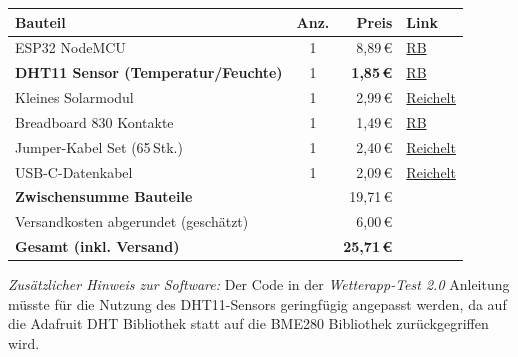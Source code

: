 \documentclass[a4paper,12pt]{article}
\begin{document}
\begin{table}[h!]
\centering
\renewcommand{\arraystretch}{1.35}
\begin{tabular}{@{} l c r l @{}}
\toprule
\textbf{Bauteil} & \textbf{Anz.} & \textbf{Preis} & \textbf{Link} \\
\midrule

ESP32 NodeMCU
  & 1 & 8,89\,\euro{}
  & \href{https://www.roboter-bausatz.de/p/nodemcu-esp32-usb-c-38-pin}{RB} \\

\textbf{DHT11 Sensor (Temperatur/Feuchte)}
  & 1 & \textbf{1,85\,\euro{}}
  & \href{https://www.roboter-bausatz.de/p/dht11-digitaler-feuchtigkeits-und-temperatursensor}{RB} \\

Kleines Solarmodul
  & 1 & 2,99\,\euro{}
  & \href{https://www.reichelt.de/de/de/shop/produkt/entwicklerboards_-_solarpanel_0_5_w-254385}{Reichelt} \\

Breadboard 830 Kontakte
  & 1 & 1,49\,\euro{}
  & \href{https://www.roboter-bausatz.de/p/mb102-breadboard-830-kontakte}{RB} \\

Jumper-Kabel Set (65\,Stk.)
  & 1 & 2,40\,\euro{}
  & \href{https://www.reichelt.de/de/de/shop/produkt/entwicklerboards_-_kabel-set_verschiedene_laengen_65er-pack_-282690}{Reichelt} \\

USB-C-Datenkabel
  & 1 & 2,09\,\euro{}
  & \href{https://www.reichelt.de/de/de/shop/produkt/sync-_ladekabel_usb-a_-_usb-c_0_5_m_schwarz-215846}{Reichelt} \\

\midrule
\multicolumn{2}{l}{\textbf{Zwischensumme Bauteile}}
  & 19,71\,\euro{} & \\
\multicolumn{2}{l}{Versandkosten abgerundet (geschätzt)}
  & 6,00\,\euro{} & \\
\midrule
\multicolumn{2}{l}{\textbf{Gesamt (inkl. Versand)}}
  & \textbf{25,71\,\euro{}} & \\
\bottomrule
\end{tabular}
\label{tab:kosten-dht11}
\end{table}

\smallskip\noindent
\textit{Zusätzlicher Hinweis zur Software:} Der Code in der \emph{Wetterapp-Test 2.0} Anleitung müsste für die Nutzung des DHT11-Sensors geringfügig angepasst werden, da auf die Adafruit DHT Bibliothek statt auf die BME280 Bibliothek zurückgegriffen wird.
\end{document}
